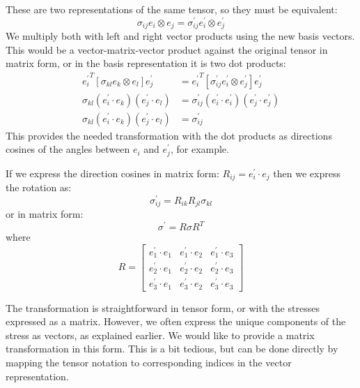 \documentclass{article}
\begin{document}
These are two representations of the same tensor, so they must be equivalent:
\begin{equation}
    \sigma_{ij} e_i \otimes e_j = \sigma^\prime_{ij} e^\prime_i \otimes e^\prime_j
\end{equation}
We multiply both with left and right vector products using the new basis vectors.   This would be a vector-matrix-vector product against the original tensor in matrix form, or in the basis representation it is two dot products:
\begin{align}
    {e^\prime_i}^T \left[ \sigma_{kl} e_k \otimes e_l \right] e^\prime_j &= {e^\prime_i}^T \left[ \sigma^\prime_{ij} e^\prime_i \otimes e^\prime_j \right] e^\prime_j\\
    \sigma_{kl} (e^\prime_i \cdot e_k) (e^\prime_j \cdot e_l) &= \sigma^\prime_{ij} (e^\prime_i \cdot e^\prime_i) (e^\prime_j \cdot e^\prime_j)\\
    \sigma_{kl} (e^\prime_i \cdot e_k) (e^\prime_j \cdot e_l) &= \sigma^\prime_{ij}
\end{align}
This provides the needed transformation with the dot products as directions cosines of the angles between $e_i$ and $e^\prime_j$, for example.

If we express the direction cosines in matrix form: $R_{ij} = e_i^\prime \cdot e_j$ then we express the rotation as:
\begin{equation}
\sigma^\prime_{ij} = R_{ik} R_{jl} \sigma_{kl}
\label{eq:sigmatensor}
\end{equation}
or in matrix form:
\begin{equation}
\sigma^\prime = R \sigma R^T
\end{equation}
where
\begin{equation}
    R =
    \begin{bmatrix}
        e_1^\prime \cdot e_1 & e_1^\prime \cdot e_2 & e_1^\prime \cdot e_3 \\
        e_2^\prime \cdot e_1 & e_2^\prime \cdot e_2 & e_2^\prime \cdot e_3 \\
        e_3^\prime \cdot e_1 & e_3^\prime \cdot e_2 & e_3^\prime \cdot e_3
    \end{bmatrix}
    \label{eq:Rmatrix}
\end{equation}

The transformation is straightforward in tensor form, or with the stresses expressed as a matrix.  However, we often express the unique components of the stress as vectors, as explained earlier. We would like to provide a matrix transformation in this form.  This is a bit tedious, but can be done directly by mapping the tensor notation to corresponding indices in the vector representation.
\end{document}
